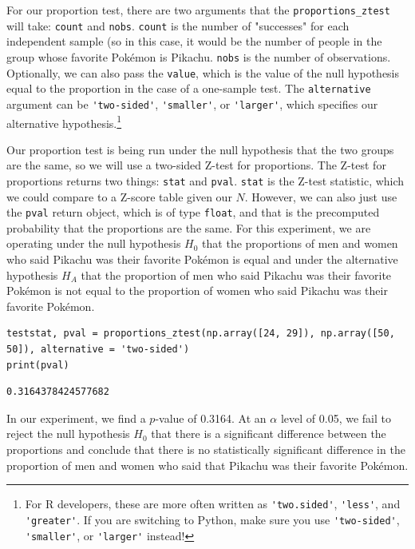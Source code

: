 For our proportion test, there are two arguments that the \verb|proportions_ztest| will take: \verb|count| and \verb|nobs|. \verb|count| is the number of "successes" for each independent sample (so in this case, it would be the number of people in the group whose favorite Pok\'emon is Pikachu. \verb|nobs| is the number of observations. Optionally, we can also pass the \verb|value|, which is the value of the null hypothesis equal to the proportion in the case of a one-sample test. The \verb|alternative| argument can be \verb|'two-sided'|, \verb|'smaller'|, or \verb|'larger'|, which specifies our alternative hypothesis.\cprotect\footnote{For R developers, these are more often written as \verb|'two.sided'|, \verb|'less'|, and \verb|'greater'|. If you are switching to Python, make sure you use \verb|'two-sided'|, \verb|'smaller'|, or \verb|'larger'| instead!}\par
Our proportion test is being run under the null hypothesis that the two groups are the same, so we will use a two-sided Z-test for proportions. The Z-test for proportions returns two things: \verb|stat| and \verb|pval|. \verb|stat| is the Z-test statistic, which we could compare to a Z-score table given our $N$. However, we can also just use the \verb|pval| return object, which is of type \verb|float|, and that is the precomputed probability that the proportions are the same.
For this experiment, we are operating under the null hypothesis $H_0$ that the proportions of men and women who said Pikachu was their favorite Pok\'emon is equal and under the alternative hypothesis $H_A$ that the proportion of men who said Pikachu was their favorite Pok\'emon is not equal to the proportion of women who said Pikachu was their favorite Pok\'emon.\par
\begin{lstlisting}[style=pippython]
teststat, pval = proportions_ztest(np.array([24, 29]), np.array([50, 50]), alternative = 'two-sided')
print(pval)
\end{lstlisting}
\begin{lstlisting}[style=none]
0.3164378424577682
\end{lstlisting}
In our experiment, we find a $p$-value of 0.3164. At an $\alpha$ level of 0.05, we fail to reject the null hypothesis $H_0$ that there is a significant difference between the proportions and conclude that there is no statistically significant difference in the proportion of men and women who said that Pikachu was their favorite Pok\'emon.
